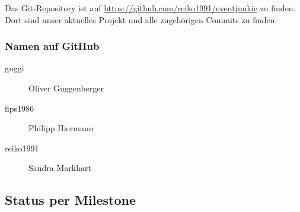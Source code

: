 \documentclass{article}
\begin{document}
Das Git-Repository ist auf \href{https://github.com/reiko1991/eventjunkie}{https://github.com/reiko1991/eventjunkie} zu finden. Dort sind unser aktuelles Projekt und alle zugehörigen Commits zu finden.

\subsubsection{Namen auf GitHub}
    \begin{description}
        \item[guggi] Oliver Guggenberger
        \item[fips1986] Philipp Hiermann
        \item[reiko1991] Sandra Markhart
    \end{description}


\subsection{Status per Milestone}
\end{document}
